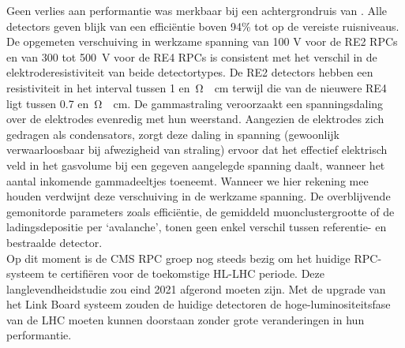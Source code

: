 	Geen verlies aan performantie was merkbaar bij een achtergrondruis van . Alle detectors geven blijk van een efficiëntie boven 94\% tot op de vereiste ruisniveaus. De opgemeten verschuiving in werkzame spanning van 100 V voor de RE2 RPCs en van 300 tot \SI{500}{V} voor de RE4 RPCs is consistent met het verschil in de elektroderesistiviteit van beide detectortypes. De RE2 detectors hebben een resistiviteit in het interval tussen 1 en \,\si{\ohm\cdot cm} terwijl die van de nieuwere RE4 ligt tussen 0.7 en \,\si{\ohm\cdot cm}. De gammastraling veroorzaakt een spanningsdaling over de elektrodes evenredig met hun weerstand. Aangezien de elektrodes zich gedragen als condensators, zorgt deze daling in spanning (gewoonlijk verwaarloosbaar bij afwezigheid van straling) ervoor dat het effectief elektrisch veld in het gasvolume bij een gegeven aangelegde spanning daalt, wanneer het aantal inkomende gammadeeltjes toeneemt. Wanneer we hier rekening mee houden verdwijnt deze verschuiving in de werkzame spanning. De overblijvende gemonitorde parameters zoals efficiëntie, de gemiddeld muonclustergrootte of de ladingsdepositie per ‘avalanche’, tonen geen enkel verschil tussen referentie- en bestraalde detector.\\
	Op dit moment is de CMS RPC groep nog steeds bezig om het huidige RPC-systeem te certifiëren voor de toekomstige HL-LHC periode. Deze langlevendheidstudie zou eind 2021 afgerond moeten zijn. Met de upgrade van het Link Board systeem zouden de huidige detectoren de hoge-luminositeitsfase van de LHC moeten kunnen doorstaan zonder grote veranderingen in hun performantie.

\clearpage{\pagestyle{empty}\cleardoublepage}


